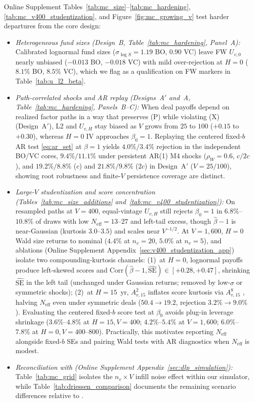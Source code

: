 \documentclass[12pt]{article}
\begin{document}
Online Supplement Tables~\ref{tab:mc_size}--\ref{tab:mc_hardening}, \ref{tab:mc_v400_studentization}, and Figure~\ref{fig:mc_growing_v} test harder departures from the core design:
\begin{itemize}
  \item \emph{Heterogeneous fund sizes (Design~B, Table~\ref{tab:mc_hardening}, Panel~A):} Calibrated lognormal fund sizes ($\sigma_{\log S} = 1.19$ BO, $0.90$ VC) leave FW $U_{v,0}$ nearly unbiased ($-0.013$ BO, $-0.018$ VC) with mild over-rejection at $H = 0$ ($8.1\%$ BO, $8.5\%$ VC), which we flag as a qualification on FW markers in Table~\ref{tab:u_l2_beta}.
  \item \emph{Path-correlated shocks and AR replay (Designs~A$'$ and~A, Table~\ref{tab:mc_hardening}, Panels~B--C):} When deal payoffs depend on realized factor paths in a way that preserves (P) while violating (X) (Design~A$'$), L2 and $U_{v,H}$ stay biased as $V$ grows from $25$ to $100$ ($+0.15$ to $+0.30$), whereas $H=0$ IV approaches $\beta_0 = 1$. Replaying the centered fixed-$b$ AR test \eqref{eq:ar_set} at $\beta = 1$ yields $4.0\%/3.4\%$ rejection in the independent BO/VC cores, $9.4\%/11.1\%$ under persistent AR(1) M4 shocks ($\rho_W = 0.6$, $c/2c$), and $19.2\%/8.8\%$ ($c$) and $21.8\%/9.8\%$ ($2c$) in Design~A$'$ ($V = 25/100$), showing root robustness and finite-$V$ persistence coverage are distinct.
  \item \emph{Large-$V$ studentization and score concentration (Tables~\ref{tab:mc_size_additions} and~\ref{tab:mc_v400_studentization}):} On resampled paths at $V = 400$, equal-vintage $U_{v,H}$ still rejects $\beta_0 = 1$ in $6.8\%$--$10.8\%$ of draws with low $N_{\mathrm{eff}} = 13$--$27$ and left-tail excess, though $\hat\beta - 1$ is near-Gaussian (kurtosis $3.0$--$3.5$) and scales near $V^{-1/2}$. At $V = 1{,}600$, $H=0$ Wald size returns to nominal ($4.4\%$ at $n_v=20$, $5.0\%$ at $n_v=5$), and ablations (Online Supplement Appendix~\ref{sec:v400_studentization_app}) isolate two compounding-kurtosis channels: (1)~at $H=0$, lognormal payoffs produce left-skewed scores and $\mathrm{Corr}(\hat\beta-1, \widehat{\mathrm{SE}}) \in [+0.28, +0.47]$, shrinking $\widehat{\mathrm{SE}}$ in the left tail (unchanged under Gaussian returns; removed by low-$\sigma$ or symmetric shocks); (2)~at $H=15$~yr, $A_{v,15}^2$ inflates score kurtosis via $A_{v,15}^8$ \citep[cf.][]{Martin12}, halving $N_{\mathrm{eff}}$ even under symmetric deals ($50.4 \to 19.2$, rejection $3.2\% \to 9.0\%$). Evaluating the centered fixed-$b$ score test at $\beta_0$ avoids plug-in leverage shrinkage ($3.6\%$--$4.8\%$ at $H=15, V=400$; $4.2\%$--$5.4\%$ at $V=1{,}600$; $6.0\%$--$7.8\%$ at $H=0, V=400\text{--}800$). Practically, this motivates reporting $N_{\mathrm{eff}}$ alongside fixed-$b$ SEs and pairing Wald tests with AR diagnostics when $N_{\mathrm{eff}}$ is modest.
  \item \emph{Reconciliation with \citet{DLP12} (Online Supplement Appendix~\ref{sec:dlp_simulation}):} Table~\ref{tab:mc_grid} isolates the $n_v \times V$ infill noise effect within our simulator, while Table~\ref{tab:driessen_comparison} documents the remaining scenario differences relative to \citet[Table~1]{DLP12}.
\end{itemize}
\end{document}

